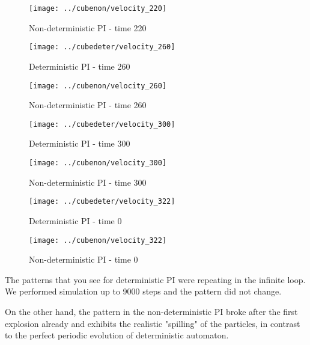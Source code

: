 \begin{figure}[H]
 \centering 
 \texttt{[image: ../cubenon/velocity\_220]}
 \caption{Non-deterministic PI - time 220}
\end{figure}

\begin{figure}[H]
 \centering 
 \texttt{[image: ../cubedeter/velocity\_260]}
 \caption{Deterministic PI - time 260}
\end{figure}

\begin{figure}[H]
 \centering 
 \texttt{[image: ../cubenon/velocity\_260]}
 \caption{Non-deterministic PI - time 260}
\end{figure}

\begin{figure}[H]
 \centering 
 \texttt{[image: ../cubedeter/velocity\_300]}
 \caption{Deterministic PI - time 300}
\end{figure}

\begin{figure}[H]
 \centering 
 \texttt{[image: ../cubenon/velocity\_300]}
 \caption{Non-deterministic PI - time 300}
\end{figure}

\begin{figure}[H]
 \centering 
 \texttt{[image: ../cubedeter/velocity\_322]}
 \caption{Deterministic PI - time 0}
\end{figure}

\begin{figure}[H]
 \centering 
 \texttt{[image: ../cubenon/velocity\_322]}
 \caption{Non-deterministic PI - time 0}
\end{figure}

The patterns that you see for deterministic PI were repeating in the infinite loop. We performed simulation up to 9000 steps and the pattern did not change.

On the other hand, the pattern in the non-deterministic PI broke after the first explosion already and exhibits the realistic "spilling" of the particles, in contrast to the perfect periodic evolution of deterministic automaton.
